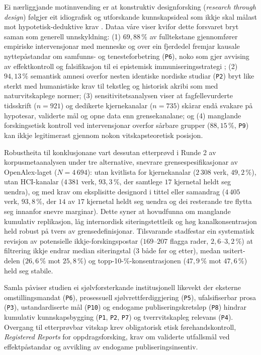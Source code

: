 \documentclass[11pt,a4paper]{article}
\begin{document}
Ei nærliggjande motinnvending er at konstruktiv designforsking (\emph{research through design}) følgjer eit idiografisk og utforskande kunnskapsideal som ikkje skal målast mot hypotetisk-deduktive krav \cite{gaver2012,redstrom2017}. Dataa våre viser kvifor dette forsvaret bryt saman som generell unnskyldning: (1) $69{,}88\,\%$ av fulltekstane gjennomfører empiriske intervensjonar med menneske og over ein fjerdedel fremjar kausale nyttepåstandar om samfunns- og tenesteforbetring (\texttt{P6}), noko som gjer avvising av effektkontroll og falsifikasjon til ei epistemisk immuniseringsstrategi \cite{albert1968,boudry2011}; (2) $94{,}13\,\%$ semantisk amnesi overfor nesten identiske nordiske studiar (\texttt{P2}) bryt like sterkt med humanistiske krav til tekstleg og historisk akribi som med naturvitskaplege normer; (3) sensitivitetsanalysen viser at fagfellevurderte tidsskrift ($n=921$) og dedikerte kjernekanalar ($n=735$) skårar endå svakare på hypotesar, validerte mål og opne data enn grensekanalane; og (4) manglande forskingsetisk kontroll ved intervensjonar overfor sårbare grupper ($88{,}15\,\%$, \texttt{P9}) kan ikkje legitimerast gjennom nokon vitskapsteoretisk posisjon.

Robustheita til konklusjonane vart dessutan etterprøvd i Runde 2 av korpusmetaanalysen under tre alternative, snevrare grensespesifikasjonar av OpenAlex-laget ($N = 4\,694$): utan kvitlista for kjernekanalar ($2\,308$ verk, $49{,}2\,\%$), utan HCI-kanalar ($4\,381$ verk, $93{,}3\,\%$, der samtlege $17$ kjernetal heldt seg uendra), og med krav om eksplisitte designord i tittel eller samandrag ($4\,405$ verk, $93{,}8\,\%$, der $14$ av $17$ kjernetal heldt seg uendra og dei resterande tre flytta seg innanfor snevre marginar). Dette syner at hovudfunna om manglande kumulativ replikasjon, låg internordisk siteringstettleik og høg kanalkonsentrasjon held robust på tvers av grensedefinisjonar. Tilsvarande stadfestar ein systematisk revisjon av potensielle ikkje-forskingspostar ($169$--$207$ flagga rader, $2{,}6$--$3{,}2\,\%$) at filtrering ikkje endrar median siteringstal ($3$ både før og etter), medan usitert-delen ($26{,}6\,\%$ mot $25{,}8\,\%$) og topp-10-\%-konsentrasjonen ($47{,}9\,\%$ mot $47{,}6\,\%$) held seg stabile.

Samla påviser studien ei sjølvforsterkande institusjonell likevekt \cite{whitley2000,smaldino2016} der eksterne omstillingsmandat (\texttt{P6}), prosessuell sjølvrettferdiggjering (\texttt{P5}), ufalsifiserbar prosa (\texttt{P3}), ustandardiserte mål (\texttt{P10}) og endogame publiseringskretsløp (\texttt{P8}) hindrar kumulativ kunnskapsbygging (\texttt{P1}, \texttt{P2}, \texttt{P7}) og tverrvitskapleg relevans (\texttt{P4}). Overgang til etterprøvbar vitskap krev obligatorisk etisk førehandskontroll, \emph{Registered Reports} for oppdragsforsking, krav om validerte utfallsmål ved effektpåstandar og avvikling av endogame publiseringsinsentiv.
\end{document}
